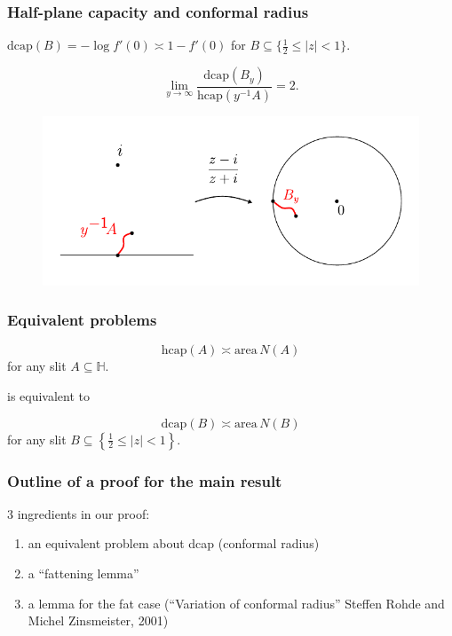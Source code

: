 \documentclass[xcolor=pdftex,dvipsnames,table]{beamer}
\newcommand{\bbH}{\mathbb{H}}
\newcommand{\half}{\frac{1}{2}}
\newcommand{\area}{\text{area}\,}
\newcommand{\dcap}{\text{dcap}}
\newcommand{\hcap}{\text{hcap}}
\theoremstyle{definition}
\begin{document}
\begin{frame}
  \frametitle{Half-plane capacity and conformal radius}
  $\dcap(B) = - \log f'(0) \asymp 1 - f'(0)$ for $B \subseteq \{ \half \leq \left| z \right| < 1 \}$.
  \begin{lemma}
    \[
      \lim_{y \to \infty} \frac{\dcap(B_y)}{\hcap(y^{-1}A)} = 2.
    \]  
  \end{lemma}
  \begin{figure}
      \includegraphics[scale=0.6]{figures/hcap_dcap.pdf}
  \end{figure}
  \vspace{-0.1in}
\end{frame}

\begin{frame}
  \frametitle{Equivalent problems}
  \begin{problem}
    \[
        \hcap(A) \asymp \area N(A)
    \]
    for any slit $A \subseteq \bbH$.
  \end{problem}
  \vspace{.2in} is equivalent to \vspace{.2in}
  \begin{problem}
    \[
        \dcap(B) \asymp \area N(B)
    \]
    for any slit $B \subseteq \left\{ \half \leq \left|z\right| < 1 \right\}$.
  \end{problem}    
\end{frame}

\begin{frame}
  \frametitle{Outline of a proof for the main result}
  3 ingredients in our proof: \vspace{.2in}
  \begin{enumerate} \setlength{\itemsep}{.2in}
    \item  {\color{black!30} an equivalent problem about dcap (conformal radius)}
    \item  a ``fattening lemma''
    \item  a lemma for the fat case (``Variation of conformal radius''
              Steffen Rohde and Michel Zinsmeister, 2001)
  \end{enumerate}
\end{frame}
\end{document}
